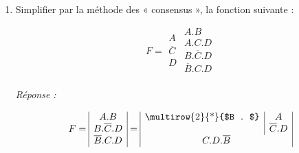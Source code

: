 \begin{enumerate} [label=\arabic*$^\circ$]
\textsl{Réponse :}

\medskip

\[ \pi = 
\begin{array}{|c|c|c|c|c|} A & A & A & A & \overline{A} \\
                           B & B & B & B & B \\
                           C & C & \overline{C}    & \overline{C}  & \overline{C}   \\
                           D  & \overline{D} & D & \overline{D}& \overline{D}  \end{array}
                               = \begin{array}{|c|c|} 
                                     \multicolumn{2}{|c|}{B} \\
                                    $\multirow{2}{*}{$ A . $}$  & \overline{C} \\
                                                              & \overline{D} \\
                                 \end{array} 
\]

\medskip 

\item Simplifier par la méthode des « consensus », la fonction suivante :
\medskip

\[ F = 
\begin{array}{|c}  A \\ \overline{C} \\ D \\    \end{array}
      \begin{array}{|c|} A . B \\
					A . C . D \\
					B . \overline{C} . D \\
					\overline{B} . C . D \\	      
       \end{array} 
\]


\medskip 


\textsl{Réponse :}

\medskip

\[ F = 
\begin{array}{|c|} 
      A . B \\
     B . \overline{C} . D \\
     \overline{B} . C . D \\            
\end{array}
    = \begin{array}{|c|c|} 
         $\multirow{2}{*}{$B . $}$   & A \\
                                     & \overline{C} . D \\
         \multicolumn{2}{|c|}{C . D . \overline{B}} \\                            
      \end{array} 
\]


\end{enumerate}
